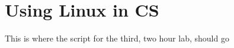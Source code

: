 \chapter{Using Linux in CS}

\begin{note}
  This is where the script for the third, two hour lab, should go
\end{note}

